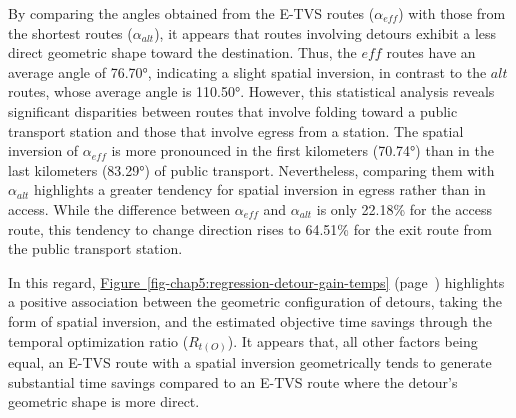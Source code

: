 \begin{refsegment}
By comparing the angles obtained from the \acrshort{E-TVS} routes ($\alpha_{eff}$) with those from the shortest routes ($\alpha_{alt}$), it appears that routes involving detours exhibit a less direct geometric shape toward the destination. Thus, the \(eff\) routes have an average angle of 76.70°, indicating a slight spatial inversion, in contrast to the \(alt\) routes, whose average angle is 110.50°. However, this statistical analysis reveals significant disparities between routes that involve folding toward a public transport station and those that involve egress from a station. The spatial inversion of $\alpha_{eff}$ is more pronounced in the first kilometers (70.74°) than in the last kilometers (83.29°) of public transport. Nevertheless, comparing them with $\alpha_{alt}$ highlights a greater tendency for spatial inversion in egress rather than in access. While the difference between $\alpha_{eff}$ and $\alpha_{alt}$ is only 22.18\% for the access route, this tendency to change direction rises to 64.51\% for the exit route from the public transport station.%
 
In this regard, \hyperref[fig-chap5:regression-detour-gain-temps]{Figure~\ref{fig-chap5:regression-detour-gain-temps}} (page~\pageref{fig-chap5:regression-detour-gain-temps}) highlights a positive association between the geometric configuration of detours, taking the form of spatial inversion, and the estimated objective time savings through the temporal optimization ratio (\(R_{t{(O)}}\)). It appears that, all other factors being equal, an \acrshort{E-TVS} route with a spatial inversion geometrically tends to generate substantial time savings compared to an \acrshort{E-TVS} route where the detour's geometric shape is more direct.%


\end{refsegment}
